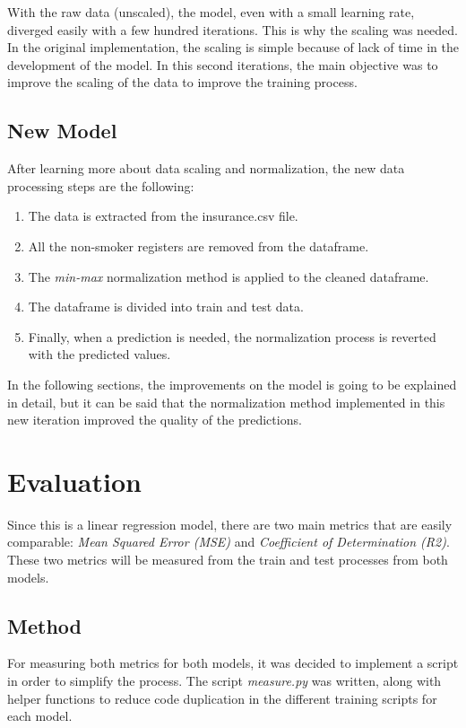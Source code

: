 \documentclass[11pt]{article}
\begin{document}
    With the raw data (unscaled), the model, even with a small learning rate, diverged easily with a few hundred
    iterations. This is why the scaling was needed. In the original implementation, the scaling is simple because of
    lack of time in the development of the model. In this second iterations, the main objective was to improve the
    scaling of the data to improve the training process.

\subsection{New Model}
    After learning more about data scaling and normalization, the new data processing steps are the following:
    \begin{enumerate}
        \item The data is extracted from the insurance.csv file.
        \item All the non-smoker registers are removed from the dataframe.
        \item The \textit{min-max} normalization method is applied to the cleaned dataframe.
        \item The dataframe is divided into train and test data.
        \item Finally, when a prediction is needed, the normalization process is reverted with the predicted values.
    \end{enumerate}

    In the following sections, the improvements on the model is going to be explained in detail, but it can be said that
    the normalization method implemented in this new iteration improved the quality of the predictions.

\section{Evaluation}
    Since this is a linear regression model, there are two main metrics that are easily comparable:
    \textit{Mean Squared Error (MSE)} and \textit{Coefficient of Determination (R2)}. These two metrics will be measured
    from the train and test processes from both models.

\subsection{Method}
    For measuring both metrics for both models, it was decided to implement a script in order to simplify the process.
    The script \textit{measure.py} was written, along with helper functions to reduce code duplication in the different
    training scripts for each model.
\end{document}
